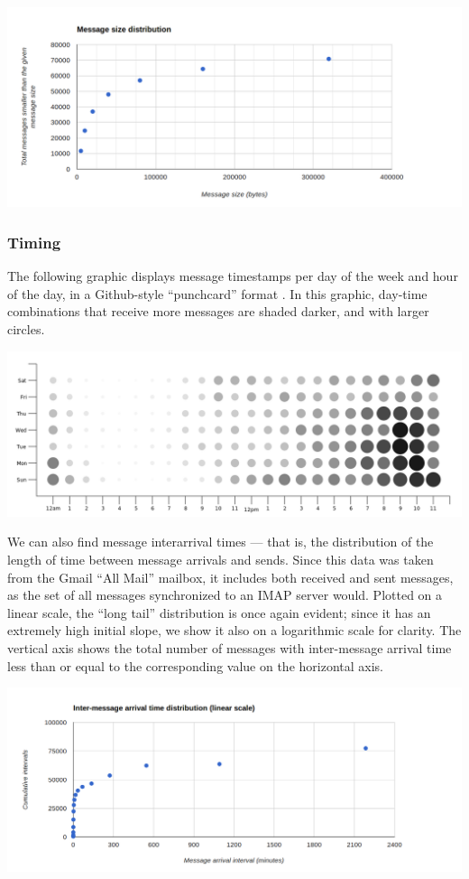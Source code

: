 \documentclass[pageno]{jpaper}
\begin{document}
\includegraphics[width=\textwidth]{message-size-dist}

\subsubsection{Timing}

The following graphic displays message timestamps per day of the week and hour of the day, in a Github-style ``punchcard'' format \cite{punchcard}. In this graphic, day-time combinations that receive more messages are shaded darker, and with larger circles.

\includegraphics[width=\textwidth]{punchcard}

We can also find message interarrival times \---- that is, the distribution of the length of time between message arrivals and sends. Since this data was taken from the Gmail ``All Mail'' mailbox, it includes both received and sent messages, as the set of all messages synchronized to an IMAP server would. Plotted on a linear scale, the ``long tail'' distribution is once again evident; since it has an extremely high initial slope, we show it also on a logarithmic scale for clarity. The vertical axis shows the total number of messages with inter-message arrival time less than or equal to the corresponding value on the horizontal axis.

\includegraphics[width=\textwidth]{intermessagelinear}
\end{document}
